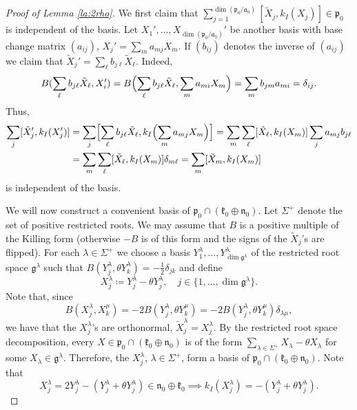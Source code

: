 \documentclass[JEP,XML,SOM,NoFloatCountersInSection,Unicode,published]{cedram}
\newcommand{\BIk}[1]{\ensuremath{k_I\Bigl(#1\Bigr)}}
\theoremstyle{definition}
\newcommand{\mf}[1]{\ensuremath{\mathfrak{#1}}}
\newcommand{\Ik}[1]{\ensuremath{k_I(#1)}}
\begin{document}
\begin{proof}[Proof of Lemma \ref{la:2rho}]
We first claim that $\sum_{j=1}^{\dim(\mf p_0/\mf a_0)}[\tilde X_j,\Ik{X_j}]\in\mf p_0$ is independent of the basis. Let $X_1',\ldots,X_{\dim(\mf p_0/\mf a_0)}'$ be another basis with base change matrix $(a_{ij})$, \ie $X_j'=\sum_ma_{mj}X_m$.
If $(b_{ij})$ denotes the inverse of $(a_{ij})$ we claim that $\tilde X_j'=\sum_\ell b_{j\ell}\tilde X_\ell$. Indeed,\vspace*{-3pt}
\begin{align*}
B(\sum_\ell b_{j\ell}\tilde X_\ell, X_i')=B\Bigl(\sum_\ell b_{j\ell}\tilde X_\ell, \sum_ma_{mi}X_m\Bigr)=\sum_m b_{jm}a_{mi}=\delta_{ij}.
\end{align*}
Thus,
\begin{align*}
\sum_j[\tilde X_j',\Ik{X_j'}]&=
\sum_j\Bigl[\sum_\ell b_{j\ell}\tilde X_\ell,\BIk{\sum_ma_{mj}X_m}\Bigr]=\sum_m\sum_\ell[\tilde X_\ell,\Ik{X_m}]\sum_ja_{mj}b_{j\ell}\\
&=\sum_m\sum_\ell[\tilde X_\ell,\Ik{X_m}]\delta_{m\ell}=\sum_m[\tilde X_m,\Ik{X_m}]
\end{align*}
is independent of the basis.\par
We will now construct a convenient basis of $\mf p_0\cap(\mf k_0\oplus\mf n_0)$. Let $\Sigma^+$ denote the set of positive restricted roots. We may assume that $B$ is a positive multiple of the Killing form (otherwise $-B$ is of this form and the signs of the $\tilde X_j$'s are flipped). For each $\lambda\in\Sigma^+$ we choose a basis $Y_1^\lambda,\ldots,Y_{\dim\mf g^\lambda}^\lambda$ of the restricted root space $\mf g^\lambda$ such that $B(Y_j^\lambda,\theta Y_k^\lambda)=-\frac12\delta_{jk}$ and define\vspace*{-3pt}
\[
X_j^\lambda\coloneqq Y_j^\lambda-\theta Y_j^\lambda,\quad j\in\{1,\ldots,\dim\mf g^\lambda\}.
\]
Note that, since
\[
B(X_j^\lambda,X_k^\mu)=-2B(Y_j^\lambda,\theta Y_k^\mu)=-2B(Y_j^\lambda,\theta Y_k^\mu)\delta_{\lambda\mu},
\]
we have that the $X_j^\lambda$'s are orthonormal, \ie $\tilde X_j^\lambda=X_j^\lambda$.
By the restricted root space decomposition, every $X\in\mf p_0\cap(\mf k_0\oplus\mf n_0)$ is of the form $\sum_{\lambda\in\Sigma^+}X_\lambda-\theta X_\lambda$ for some $X_\lambda\in\mf g^\lambda$. Therefore, the $X_j^\lambda$, $\lambda\in\Sigma^+$, form a basis of $\mf p_0\cap(\mf k_0\oplus\mf n_0)$. Note that\vspace*{-3pt}
\[
X_j^\lambda=2Y_j^\lambda-(Y_j^\lambda+\theta Y_j^\lambda)\in\mf n_0\oplus\mf k_0\implies\Ik{X_j^\lambda}=-(Y_j^\lambda+\theta Y_j^\lambda).
\]
\end{proof}
\end{document}
